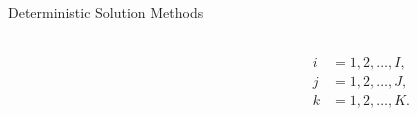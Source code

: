 \documentclass[handout]{beamer} %
\makeatletter
\def\tikzscale{1}\begin{lrbox}{\measure@tikzpicture}%
\edef\tikzscale{\pgfmathresult}%
\makeatother
\begin{document}
\begin{frame}{Deterministic Solution Methods}
\begin{columns}
\begin{column}{0.7\textwidth}
\begin{center}
\begin{scaletikzpicturetowidth}{0.5\textwidth}
\end{scaletikzpicturetowidth}
\end{center}
\end{column}
%
\begin{column}{0.3\textwidth}
\begin{align*}
\begin{split}
i &= 1,2,\ldots,I,\\
j &= 1,2,\ldots,J,\\
k &= 1,2,\ldots,K.
\end{split}
\end{align*}
\end{column}
\end{columns}
%
\end{frame}
\end{document}

